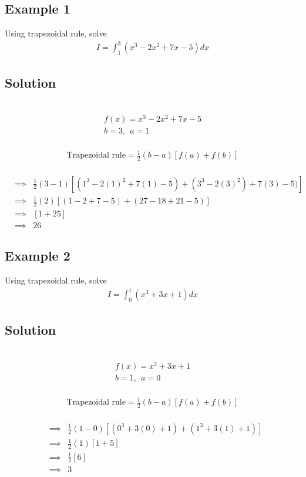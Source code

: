 \documentclass[12pt]{report}
\newcommand{\sps}{\\[0.2cm]}
\begin{document}
	\subsection{Example 1}
	Using trapezoidal rule, solve
	\begin{eqnarray*}
		I = \int_1^3\left(x^3 - 2x^2 + 7x - 5\right)dx
	\end{eqnarray*}
	
	\subsection*{Solution}
	{~}\\[-2.1cm]
	\begin{gather*}
		f(x) = x^3 - 2x^2 + 7x - 5\sps
		b=3,~~ a=1
	\end{gather*}
	{~}\\[-2.1cm]
	\begin{gather*}
		\text{Trapezoidal rule} = \frac{1}{2}(b-a)[f(a) + f(b)]
	\end{gather*}
	{~}\\[-2.1cm]
	\begin{eqnarray*}
		&\implies&\frac{1}{2}(3-1)\left[(1^3-2(1)^2 + 7(1)-5) + (3^3 - 2(3)^2) + 7(3) - 5)\right] \sps
		&\implies&\frac{1}{2}(2)\left[(1-2+7-5) + (27-18 + 21-5)\right]\sps
		&\implies&[1+25]\sps
		&\implies& 26
	\end{eqnarray*}
	
	\subsection{Example 2}
	Using trapezoidal rule, solve
	\begin{eqnarray*}
		I = \int_0^1\left(x^3 + 3x + 1\right)dx
	\end{eqnarray*}
	
	\subsection*{Solution}
	{~}\\[-2.1cm]
	\begin{gather*}
		f(x) = x^3 + 3x + 1\sps
		b=1,~~ a=0
	\end{gather*}
	{~}\\[-2.1cm]
	\begin{gather*}
		\text{Trapezoidal rule} = \frac{1}{2}(b-a)[f(a) + f(b)]
	\end{gather*}
	{~}\\[-2.1cm]
	\begin{eqnarray*}
		&\implies&\frac{1}{2}(1-0)[(0^3 + 3(0) + 1) + (1^3 + 3(1) + 1)]\sps
		&\implies& \frac{1}{2}(1)[1+5]\sps
		&\implies&\frac{1}{2}[6]\sps
		&\implies& 3
	\end{eqnarray*}
	
\end{document}
